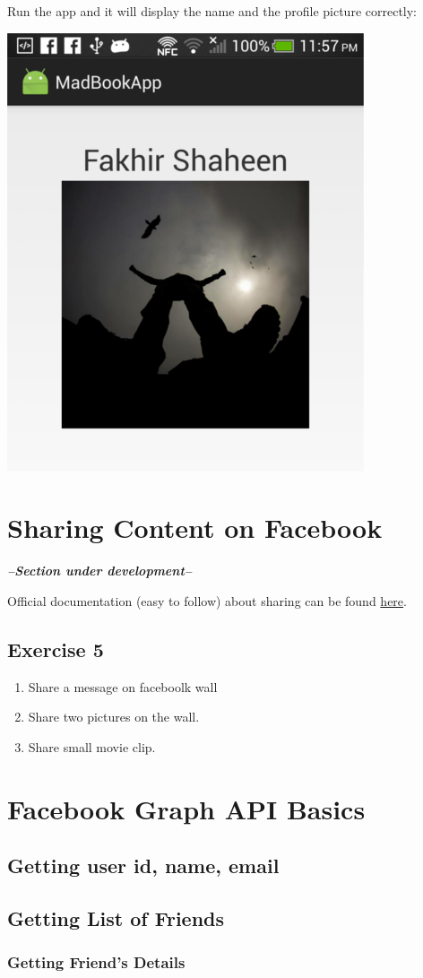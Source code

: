Run the app and it will display the name and the profile picture correctly:

\begin{center}
	\includegraphics[scale=\FigureScale]{chapters/ch12/images/34}
\end{center}


\section{Sharing Content on Facebook}

\textit{\textbf{--Section under development-- \\}}

Official documentation (easy to follow) about sharing can be found \href{https://developers.facebook.com/docs/sharing/android/}{here}.

\subsection{Exercise 5}
\begin{enumerate}
	\item Share a message on faceboolk wall
	\item Share two pictures on the wall.
	\item Share small movie clip.
\end{enumerate}


\section{Facebook Graph API Basics}
\subsection{Getting user id, name, email}

\subsection{Getting List of Friends}
\subsubsection{Getting Friend's Details}

